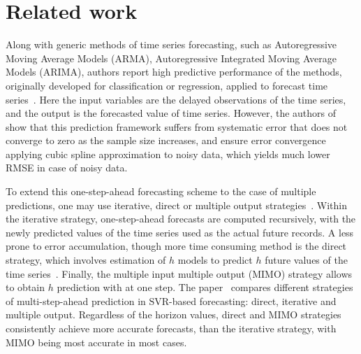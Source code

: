 \documentclass[conference]{IEEEtran}
\begin{document}
\section{Related work}
 Along with generic methods of time series forecasting, such as Autoregressive Moving Average Models (ARMA), Autoregressive Integrated Moving Average Models (ARIMA), authors report high predictive performance of the methods, originally developed for classification or regression, applied to forecast time series~\cite{Yu2016, Kane2014, Trafalis2000, Navarrete2015, Busseti2012, Taylor2009}.  Here the input variables are the delayed observations  of the time series, and the output is the forecasted value of time series. However, the authors of~\cite{Navarrete2015} show that this prediction framework suffers from systematic error that does not converge to zero as the sample size increases, and  ensure error convergence applying cubic spline approximation to noisy data, which yields much lower RMSE in case of noisy data.

 To extend this one-step-ahead forecasting scheme to the case of multiple predictions, one may use iterative, direct or multiple output strategies~\cite{Bao2014}. Within the iterative strategy, one-step-ahead forecasts are computed recursively, with the newly predicted values of the time series used as the actual future records. A less prone to error accumulation, though more time consuming method is the direct strategy, which involves estimation of $h$ models to predict $h$ future values of the time series~\cite{Zhang2013}. Finally, the multiple input multiple output (MIMO) strategy allows to obtain $h$ prediction with at one step.  The paper~\cite{Bao2014} compares different strategies of multi-step-ahead prediction in SVR-based forecasting: direct, iterative and multiple output. Regardless of the horizon values, direct and MIMO strategies consistently achieve more accurate forecasts, than the iterative strategy, with MIMO being most accurate in most cases.
\end{document}
